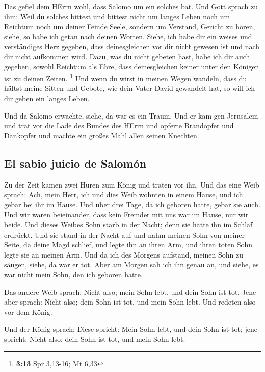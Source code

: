  Das gefiel dem HErrn wohl, dass Salomo um ein solches
bat.  Und Gott sprach zu ihm: Weil du solches bittest und
bittest nicht um langes Leben noch um Reichtum noch um deiner Feinde
Seele, sondern um Verstand, Gericht zu hören,  siehe, so
habe ich getan nach deinen Worten. Siehe, ich habe dir ein weises und
verständiges Herz gegeben, dass deinesgleichen vor dir nicht gewesen ist
und nach dir nicht aufkommen wird.  Dazu, was du nicht
gebeten hast, habe ich dir auch gegeben, sowohl Reichtum als Ehre, dass
deinesgleichen keiner unter den Königen ist zu deinen Zeiten.
\footnote{\textbf{3:13} Spr 3,13-16; Mt 6,33}  Und wenn
du wirst in meinen Wegen wandeln, dass du hältst meine Sitten und
Gebote, wie dein Vater David gewandelt hat, so will ich dir geben ein
langes Leben.

 Und da Salomo erwachte, siehe, da war es ein Traum. Und
er kam gen Jerusalem und trat vor die Lade des Bundes des HErrn und
opferte Brandopfer und Dankopfer und machte ein großes Mahl allen seinen
Knechten.

\hypertarget{el-sabio-juicio-de-salomuxf3n}{%
\subsection{El sabio juicio de
Salomón}\label{el-sabio-juicio-de-salomuxf3n}}

 Zu der Zeit kamen zwei Huren zum König und traten vor
ihn.  Und das eine Weib sprach: Ach, mein Herr, ich und
dies Weib wohnten in einem Hause, und ich gebar bei ihr im Hause.
 Und über drei Tage, da ich geboren hatte, gebar sie
auch. Und wir waren beieinander, dass kein Fremder mit uns war im Hause,
nur wir beide.  Und dieses Weibes Sohn starb in der
Nacht; denn sie hatte ihn im Schlaf erdrückt.  Und sie
stand in der Nacht auf und nahm meinen Sohn von meiner Seite, da deine
Magd schlief, und legte ihn an ihren Arm, und ihren toten Sohn legte sie
an meinen Arm.  Und da ich des Morgens aufstand, meinen
Sohn zu säugen, siehe, da war er tot. Aber am Morgen sah ich ihn genau
an, und siehe, es war nicht mein Sohn, den ich geboren hatte.

 Das andere Weib sprach: Nicht also; mein Sohn lebt, und
dein Sohn ist tot. Jene aber sprach: Nicht also; dein Sohn ist tot, und
mein Sohn lebt. Und redeten also vor dem König.

 Und der König sprach: Diese spricht: Mein Sohn lebt, und
dein Sohn ist tot; jene spricht: Nicht also; dein Sohn ist tot, und mein
Sohn lebt.

